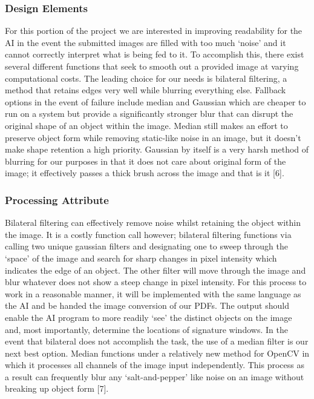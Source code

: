\documentclass[onecolumn, draftclsnofoot,10pt, compsoc]{IEEEtran}
\begin{document}
\subsubsection{Design Elements}
For this portion of the project we are interested in improving readability for the AI in the event the submitted images are filled with too much ‘noise’ and it cannot correctly interpret what is being fed to it. To accomplish this, there exist several different functions that seek to smooth out a provided image at varying computational costs. The leading choice for our needs is bilateral filtering, a method that retains edges very well while blurring everything else. Fallback options in the event of failure include median and Gaussian which are cheaper to run on a system but provide a significantly stronger blur that can disrupt the original shape of an object within the image. Median still makes an effort to preserve object form while removing static-like noise in an image, but it doesn’t make shape retention a high priority. Gaussian by itself is a very harsh method of blurring for our purposes in that it does not care about original form of the image; it effectively passes a thick brush across the image and that is it [6].

\subsubsection{Processing Attribute}
Bilateral filtering can effectively remove noise whilst retaining the object within the image. It is a costly function call however; bilateral filtering functions via calling two unique gaussian filters and designating one to sweep through the ‘space’ of the image and search for sharp changes in pixel intensity which indicates the edge of an object. The other filter will move through the image and blur whatever does not show a steep change in pixel intensity. For this process to work in a reasonable manner, it will be implemented with the same language as the AI and be handed the image conversion of our PDFs. The output should enable the AI program to more readily ‘see’ the distinct objects on the image and, most importantly, determine the locations of signature windows. In the event that bilateral does not accomplish the task, the use of a median filter is our next best option. Median functions under a relatively new method for OpenCV in which it processes all channels of the image input independently. This process as a result can frequently blur any ‘salt-and-pepper’ like noise on an image without breaking up object form [7].
\end{document}
